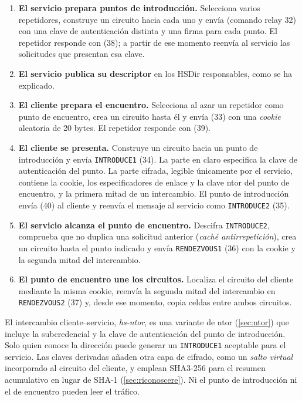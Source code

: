 \begin{enumerate}
  \item \textbf{El servicio prepara puntos de introducción.} Selecciona varios repetidores, construye un circuito hacia cada uno y envía  (comando relay 32) con una clave de autenticación distinta y una firma para cada punto. El repetidor responde con  (38); a partir de ese momento reenvía al servicio las solicitudes que presentan esa clave.
  \item \textbf{El servicio publica su descriptor} en los HSDir responsables, como se ha explicado.
  \item \textbf{El cliente prepara el encuentro.} Selecciona al azar un repetidor como punto de encuentro, crea un circuito hasta él y envía  (33) con una \emph{cookie} aleatoria de 20 bytes. El repetidor responde con  (39).
  \item \textbf{El cliente se presenta.} Construye un circuito hacia un punto de introducción y envía \texttt{INTRODUCE1} (34). La parte en claro especifica la clave de autenticación del punto. La parte cifrada, legible únicamente por el servicio, contiene la cookie, los especificadores de enlace y la clave ntor del punto de encuentro, y la primera mitad de un intercambio. El punto de introducción envía  (40) al cliente y reenvía el mensaje al servicio como \texttt{INTRODUCE2} (35).
  \item \textbf{El servicio alcanza el punto de encuentro.} Descifra \texttt{INTRODUCE2}, comprueba que no duplica una solicitud anterior (\emph{caché antirrepetición}), crea un circuito hasta el punto indicado y envía \texttt{RENDEZVOUS1} (36) con la cookie y la segunda mitad del intercambio.
  \item \textbf{El punto de encuentro une los circuitos.} Localiza el circuito del cliente mediante la misma cookie, reenvía la segunda mitad del intercambio en \texttt{RENDEZVOUS2} (37) y, desde ese momento, copia celdas entre ambos circuitos.
\end{enumerate}

El intercambio cliente--servicio, \emph{hs-ntor}, es una variante de ntor (\cref{sec:ntor}) que incluye la subcredencial y la clave de autenticación del punto de introducción. Solo quien conoce la dirección puede generar un \texttt{INTRODUCE1} aceptable para el servicio. Las claves derivadas añaden otra capa de cifrado, como un \emph{salto virtual} incorporado al circuito del cliente, y emplean SHA3-256 para el resumen acumulativo en lugar de SHA-1 (\cref{sec:riconoscere}). Ni el punto de introducción ni el de encuentro pueden leer el tráfico.

